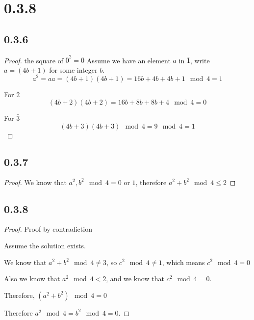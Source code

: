\documentclass[11pt]{article}
\begin{document}
\section*{0.3.8}

\subsection*{0.3.6}

\begin{proof}
	the square of $\bar{0}^2=\bar{0}$
	Assume we have an element $a$ in $\bar{1}$, write $a=(4b+1)$ for some integer $b$.
	$$
		a^2 = aa = (4b+1) (4b + 1) = 16b + 4b + 4b + 1 \mod 4 = 1
	$$

	For $\bar{2}$
	$$
		(4b+2)(4b+2) = 16b+8b+8b+4 \mod 4 = 0
	$$

	For $\bar{3}$
	$$
		(4b+3)(4b+3) \mod 4 = 9 \mod 4 = 1
	$$
\end{proof}

\subsection*{0.3.7}

\begin{proof}
	We know that $a^2,b^2 \mod 4 = 0 \text{ or } 1$, therefore $a^2+b^2 \mod 4 \le 2$
\end{proof}

\subsection*{0.3.8}

\begin{proof}
	Proof by contradiction

	Assume the solution exists.
	
	We know that $a^2+b^2 \mod 4 \neq 3$, so $c^2 \mod 4 \neq 1$, which means $c^2 \mod 4=0$

	Also we know that $a^2\mod 4 < 2$, and we know that $c^2 \mod 4 = 0$.
	
	Therefore, $(a^2 + b^2) \mod 4 = 0$

	Therefore $a^2 \mod 4 = b^2 \mod 4 = 0$.


\end{proof}
\end{document}
